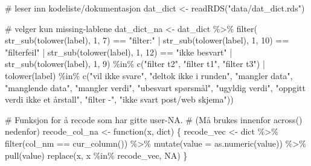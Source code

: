 \documentclass[
  letterpaper,
  DIV=11,
  numbers=noendperiod]{scrreprt}
\newenvironment{Shaded}{\begin{snugshade}}{\end{snugshade}}
\newcommand{\AttributeTok}[1]{\textcolor[rgb]{0.40,0.45,0.13}{#1}}
\newcommand{\CommentTok}[1]{\textcolor[rgb]{0.37,0.37,0.37}{#1}}
\newcommand{\ConstantTok}[1]{\textcolor[rgb]{0.56,0.35,0.01}{#1}}
\newcommand{\ControlFlowTok}[1]{\textcolor[rgb]{0.00,0.23,0.31}{#1}}
\newcommand{\DecValTok}[1]{\textcolor[rgb]{0.68,0.00,0.00}{#1}}
\newcommand{\FunctionTok}[1]{\textcolor[rgb]{0.28,0.35,0.67}{#1}}
\newcommand{\NormalTok}[1]{\textcolor[rgb]{0.00,0.23,0.31}{#1}}
\newcommand{\OtherTok}[1]{\textcolor[rgb]{0.00,0.23,0.31}{#1}}
\newcommand{\SpecialCharTok}[1]{\textcolor[rgb]{0.37,0.37,0.37}{#1}}
\newcommand{\StringTok}[1]{\textcolor[rgb]{0.13,0.47,0.30}{#1}}
\theoremstyle{definition}
\theoremstyle{remark}
\begin{document}
\begin{Shaded}
\begin{Highlighting}[]
\CommentTok{\# leser inn kodeliste/dokumentasjon}
\NormalTok{dat\_dict }\OtherTok{\textless{}{-}} \FunctionTok{readRDS}\NormalTok{(}\StringTok{"data/dat\_dict.rds"}\NormalTok{)}

\CommentTok{\# velger kun missing{-}lablene}
\NormalTok{dat\_dict\_na }\OtherTok{\textless{}{-}}\NormalTok{ dat\_dict }\SpecialCharTok{\%\textgreater{}\%} 
  \FunctionTok{filter}\NormalTok{(  }\FunctionTok{str\_sub}\NormalTok{(}\FunctionTok{tolower}\NormalTok{(label), }\DecValTok{1}\NormalTok{, }\DecValTok{7}\NormalTok{) }\SpecialCharTok{==} \StringTok{"filter:"} \SpecialCharTok{|} 
           \FunctionTok{str\_sub}\NormalTok{(}\FunctionTok{tolower}\NormalTok{(label), }\DecValTok{1}\NormalTok{, }\DecValTok{10}\NormalTok{) }\SpecialCharTok{==} \StringTok{"filterfeil"} \SpecialCharTok{|}
           \FunctionTok{str\_sub}\NormalTok{(}\FunctionTok{tolower}\NormalTok{(label), }\DecValTok{1}\NormalTok{, }\DecValTok{12}\NormalTok{) }\SpecialCharTok{==} \StringTok{"ikke besvart"} \SpecialCharTok{|}
           \FunctionTok{str\_sub}\NormalTok{(}\FunctionTok{tolower}\NormalTok{(label), }\DecValTok{1}\NormalTok{, }\DecValTok{9}\NormalTok{) }\SpecialCharTok{\%in\%} \FunctionTok{c}\NormalTok{(}\StringTok{"filter t2"}\NormalTok{, }\StringTok{"filter t1"}\NormalTok{, }\StringTok{"filter t3"}\NormalTok{) }\SpecialCharTok{|}
           \FunctionTok{tolower}\NormalTok{(label) }\SpecialCharTok{\%in\%} \FunctionTok{c}\NormalTok{(}\StringTok{"vil ikke svare"}\NormalTok{,}
                                 \StringTok{"deltok ikke i runden"}\NormalTok{,}
                                 \StringTok{"mangler data"}\NormalTok{, }\StringTok{"manglende data"}\NormalTok{, }
                                 \StringTok{"mangler verdi"}\NormalTok{, }\StringTok{"ubesvart spørsmål"}\NormalTok{, }
                                 \StringTok{"ugyldig verdi"}\NormalTok{, }\StringTok{"oppgitt verdi ikke et årstall"}\NormalTok{,}
                                 \StringTok{"filter {-}"}\NormalTok{,}
                                 \StringTok{"ikke svart post/web skjema"}\NormalTok{)) }

\CommentTok{\# Funksjon for å recode som har gitte user{-}NA.}
\CommentTok{\# (Må brukes innenfor \textasciigrave{}across()\textasciigrave{} nedenfor)}
\NormalTok{recode\_col\_na }\OtherTok{\textless{}{-}} \ControlFlowTok{function}\NormalTok{(x, dict) \{}
\NormalTok{  recode\_vec }\OtherTok{\textless{}{-}}\NormalTok{ dict }\SpecialCharTok{\%\textgreater{}\%}
    \FunctionTok{filter}\NormalTok{(col\_nm }\SpecialCharTok{==} \FunctionTok{cur\_column}\NormalTok{()) }\SpecialCharTok{\%\textgreater{}\%}
    \FunctionTok{mutate}\NormalTok{(}\AttributeTok{value =} \FunctionTok{as.numeric}\NormalTok{(value)) }\SpecialCharTok{\%\textgreater{}\%} 
    \FunctionTok{pull}\NormalTok{(value)}
  \FunctionTok{replace}\NormalTok{(x, x }\SpecialCharTok{\%in\%}\NormalTok{ recode\_vec, }\ConstantTok{NA}\NormalTok{)}
\NormalTok{\}}
\end{Highlighting}
\end{Shaded}
\end{document}
